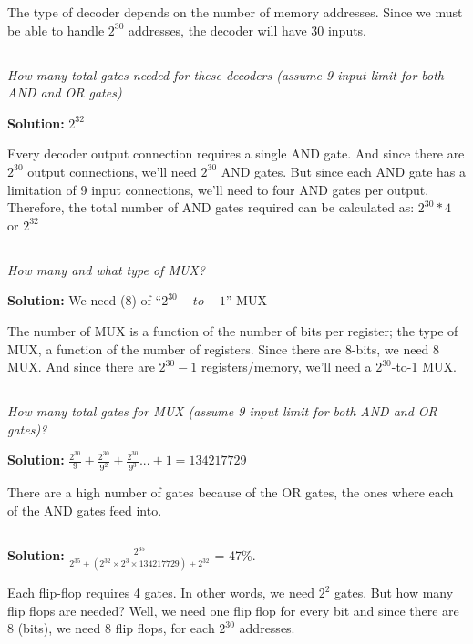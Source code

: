 \documentclass{article}
\begin{document}
The type of decoder depends on the number of memory addresses. Since we must be able to handle $2^{30}$ addresses, the decoder will have 30 inputs.

\subsection{}
\textit{How many total gates needed for these decoders (assume 9 input limit for both AND and OR gates)}

\textbf{Solution:} $2^{32}$

Every decoder output connection requires a single AND gate. And since there are $2^{30}$ output connections, we'll need $2^{30}$ AND gates. But since each AND gate has a limitation of 9 input connections, we'll need to four AND gates per output. Therefore, the total number of AND gates required can be calculated as: $2^30 * 4$ or $2^{32}$

\subsection{}
\textit{How many and what type of MUX?}

\textbf{Solution:} We need (8) of ``$2^{30}-to-1$'' MUX

The number of MUX is a function of the number of bits per register; the type of MUX, a function of the number of registers. Since there are 8-bits, we need 8 MUX. And since there are $2^{30} -1$ registers/memory, we'll need a $2^30$-to-1 MUX.

\subsection{}
\textit{How many total gates for MUX (assume 9 input limit for both AND and OR gates)?}

\textbf{Solution:} $\frac{2^{30}}{9} + \frac{2^{30}}{9^{2}} + \frac{2^{30}}{9^{3}} ... + 1 = 134217729$

There are a high number of gates because of the OR gates, the ones where each of the AND gates feed into.


\subsection{}
\textbf{Solution:} $\frac{2^{35}}{2^{35} + (2^{32} \times 2^3 \times 134217729) + 2^{32}}$ = 47\%.

Each flip-flop requires 4 gates. In other words, we need $2^2$ gates. But how many flip flops are needed? Well, we need one flip flop for every bit and since there are 8 (bits), we need 8 flip flops, for each $2^30$ addresses.
\end{document}
